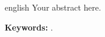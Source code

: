 \begin{resumo}[Abstract]
\begin{otherlanguage*}{english}
Your abstract here.

\textbf{Keywords:} \thekeywordsabstract.
\end{otherlanguage*}
\end{resumo}